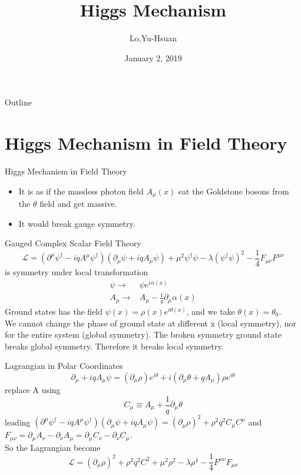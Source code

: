 \documentclass{beamer}
\title{Higgs Mechanism}
\author{Lo,Yu-Hsuan  }
\date{January 2, 2019}
\newcommand{\Lagr}{\mathcal{L}}
\begin{document}
\maketitle

\begin{frame}{Outline}
    \tableofcontents
\end{frame}

\section{Higgs Mechanism in Field Theory}
\begin{frame}{Higgs Mechanism in Field Theory}
    \begin{itemize}
        \item It is as if the massless photon field $A_\mu (x)$ eat the Goldstone bosons from the $\theta$ field and get massive.
        \item It would break gauge symmetry.
    \end{itemize}
    
\end{frame}

\begin{frame}{Gauged
Complex Scalar Field Theory}
    $$\Lagr=(\partial^\mu \psi^\dagger-iqA^\mu\psi^\dagger)(\partial_\mu \psi+iqA_\mu\psi)+\mu^2\psi^\dagger\psi-\lambda(\psi^\dagger\psi)^2-\frac{1}{4}F_{\mu\nu}F^{\mu\nu}$$
    is symmetry under local transformation 
    \begin{align*}
        \psi \rightarrow& \psi e^{i\alpha(x)}\\
        A_\mu \rightarrow& A_\mu -\frac{1}{q}\partial_\mu \alpha(x)
    \end{align*}
    Ground states has the field $\psi(x)=\rho(x)e^{i\theta(x)}$, and we take $\theta(x)=\theta_0$.\\
    We cannot change the phase of ground state at different x (local symmetry), nor for the entire system (global symmetry).
    The broken symmetry ground state breaks global symmetry. Therefore it breaks local symmetry.
\end{frame}

\begin{frame}{Lagrangian in Polar Coordinates}
    $$\partial_\mu +iqA_\mu\psi=(\partial_\mu\rho)e^{i\theta}+i(\partial_\mu\theta+qA_\mu )\rho e^{i\theta}$$
    replace A using $$C_\mu\equiv A_\mu+\frac{1}{q}\partial_\mu \theta $$ leading $(\partial^\mu \psi^\dagger-iqA^\mu\psi^\dagger)(\partial_\mu \psi+iqA_\mu\psi)=(\partial_\mu\rho)^2+\rho^2q^2C_\mu C^\mu$ and $F_{\mu\nu}=\partial_\mu A_\nu- \partial_\nu A_\mu =\partial_\mu C_\nu- \partial_\nu C_\mu  $.\\
    So the Lagrangian become $$\Lagr=(\partial_\mu \rho)^2+\rho^2q^2C^2+\mu^2\rho^2-\lambda\rho^4-\frac{1}{4}F^{\mu\nu}F_{\mu\nu}$$
\end{frame}
\end{document}
